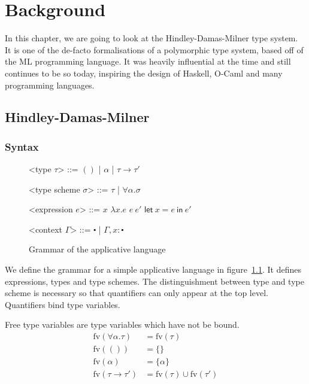 \chapter{Background}

In this chapter, we are going to look at the Hindley-Damas-Milner type
system. It is one of the de-facto formalisations of a polymorphic type
system, based off of the ML programming language. It was heavily
influential at the time and still continues to be so today, inspiring
the design of Haskell, O-Caml and many programming languages.

\section{Hindley-Damas-Milner}
\subsection{Syntax}

\def\defaultHypSeparation{\hskip .05in}
\newcommand{\letin}[2]{\mathsf{let} \ #1 \ \mathsf{in} \ #2}

\begin{figure}
  \begin{grammar}

    <type $\tau$> ::= $()$ | $\alpha$ | $\tau \rightarrow \tau'$
    
    <type scheme $\sigma$> ::= $\tau$ | $\forall \alpha . \sigma$

    <expression $e$> ::= $x$
    \alt $\lambda x . e$
    \alt $e \ e'$
    \alt $\mathsf{let} \ x = e \ \mathsf{in} \ e'$

    <context $\Gamma$> ::= $\centerdot$ | $\Gamma, x : \centerdot$

  \end{grammar}
  \caption{Grammar of the applicative language}
  \label{grm:applang}
\end{figure}

We define the grammar for a simple applicative language in
figure~\ref{grm:applang}.
It defines expressions, types and type schemes. The distinguishment
between type and type scheme is necessary so that quantifiers can only
appear at the top level. Quantifiers bind type variables.

Free type variables are type variables which have not be bound.
\begin{align*}
  \mathrm{fv}(\forall \alpha . \tau) &= \mathrm{fv}(\tau) \\
  \mathrm{fv}(()) &= \{ \} \\
  \mathrm{fv}(\alpha) &= \{ \alpha \} \\
  \mathrm{fv}(\tau \rightarrow \tau') &= \mathrm{fv}(\tau) \cup \mathrm{fv}(\tau')
\end{align*}

